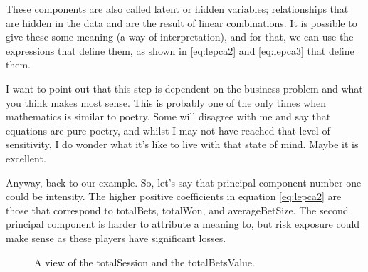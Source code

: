 \documentclass[600paper, 11pt,twoside,openany]{kdp}
\begin{document}
\indent These components are also called latent or hidden variables; relationships that are hidden in the data and are the result of linear combinations. It is possible to give these some meaning (a way of interpretation), and for that, we can use the expressions that define them, as shown in \ref{eq:lepca2} and \ref{eq:lepca3} that define them. 
\par 
\vspace{-3pt}
\indent I want to point out that this step is dependent on the business problem and what you think makes most sense. This is probably one of the only times when mathematics is similar to poetry. Some will disagree with me and say that equations are pure poetry, and whilst I may not have reached that level of sensitivity, I do wonder what it’s like to live with that state of mind. Maybe it is excellent. 
\par 
\vspace{-3pt}
\indent Anyway, back to our example. So, let’s say that principal component number one could be intensity. The higher positive coefficients in equation \ref{eq:lepca2} are those that correspond to totalBets, totalWon, and averageBetSize. The second principal component is harder to attribute a meaning to, but risk exposure could make sense as these players have significant losses.
\newpage
\begin{figure}[h!]
\begin{center}
\end{center}
\caption{A view of the totalSession and the totalBetsValue.}
\end{figure}
\end{document}
